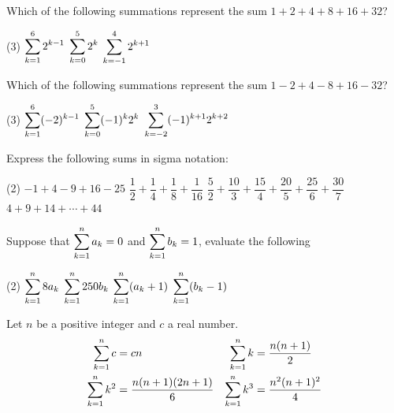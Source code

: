\documentclass[mathNotesPreamble]{subfiles}
\begin{document}
  \begin{ex*}
    Which of the following summations represent the sum $1+2+4+8+16+32$?
    \begin{tasks}(3)
      \task $\ds\sum\kto^6 2^{k-1}$
      \task $\ds\sum\kto[0]^5 2^k$
      \task $\ds\sum\kto[-1]^4 2^{k+1}$
    \end{tasks}
  \end{ex*}
  
  \begin{ex*}
    Which of the following summations represent the sum $1-2+4-8+16-32$?
    \begin{tasks}(3)
      \task $\ds\sum\kto^6 (-2)^{k-1}$
      \task $\ds\sum\kto[0]^5 (-1)^k2^k$
      \task $\ds\sum\kto[-2]^3 (-1)^{k+1}2^{k+2}$
    \end{tasks}
  \end{ex*}
  \pagebreak
  
  \begin{ex*}
    Express the following sums in sigma notation:
  \end{ex*}
  \begin{tasks}[after-item-skip=\stretch{1}](2)
    \task $-1+4-9+16-25$
    \task $\dfrac{1}{2}+\dfrac{1}{4}+\dfrac{1}{8}+\dfrac{1}{16}$
    \task $\dfrac{5}{2}+\dfrac{10}{3}+\dfrac{15}{4}+\dfrac{20}{5}+\dfrac{25}{6}+\dfrac{30}{7}$
    \task $4+9+14+\cdots+44$
  \end{tasks}
  
  \begin{ex*}
    Suppose that $\Sum\kto^n a_k=0$ and $\Sum\kto^n b_k=1$, evaluate the following
  \end{ex*}
  \begin{tasks}[after-item-skip=\stretch{1}](2)
    \task $\ds\sum\kto^n 8a_k$
    \task $\ds\sum\kto^n 250b_k$
    \task $\ds\sum\kto^n (a_k+1)$
    \task $\ds\sum\kto^n (b_k-1)$
  \end{tasks}
  \pagebreak
  
  \begin{thmBox*}
    Let $n$ be a positive integer and $c$ a real number.
    \begin{align*}
      \sum\kto^n c&=cn& 
      \sum\kto^n k &=\frac{n(n+1)}{2}\\
      \sum\kto^n k^2&=\frac{n(n+1)(2n+1)}{6}&
      \sum\kto^n k^3&=\frac{n^2(n+1)^2}{4}
    \end{align*}
  \end{thmBox*}
  
\end{document}
